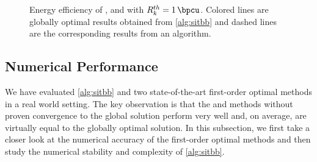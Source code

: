 \documentclass[a4paper,10pt,journal]{IEEEtran}
\begin{document}
\begin{figure}%
	\hfill%
	\caption{Energy efficiency of ,  and  with $R_k^{th} = \SI{1}{\bpcu}$. Colored lines are globally optimal results obtained from \cref{alg:sitbb} and dashed lines are the corresponding results from an  algorithm.}
	\label{fig:EE}
\end{figure}


\subsection{Numerical Performance}
We have evaluated \cref{alg:sitbb} and two state-of-the-art first-order optimal methods in a real world setting. The key observation is that the  and  methods without proven convergence to the global solution perform very well and, on average, are virtually equal to the globally optimal solution. In this subsection, we first take a closer look at the numerical accuracy of the first-order optimal methods and then study the numerical stability and complexity of \cref{alg:sitbb}.
\end{document}

